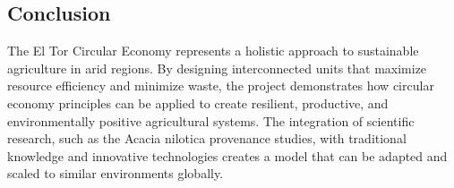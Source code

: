 \subsection{Conclusion}

The El Tor Circular Economy represents a holistic approach to sustainable agriculture in arid regions. By designing interconnected units that maximize resource efficiency and minimize waste, the project demonstrates how circular economy principles can be applied to create resilient, productive, and environmentally positive agricultural systems. The integration of scientific research, such as the Acacia nilotica provenance studies, with traditional knowledge and innovative technologies creates a model that can be adapted and scaled to similar environments globally.
